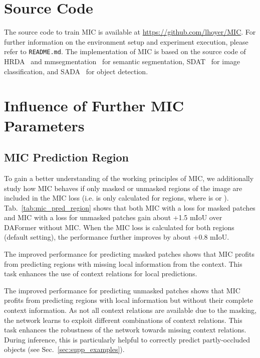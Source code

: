 \documentclass[10pt,twocolumn,letterpaper]{article}
\begin{document}
\section{Source Code}
\label{sec:supp_further_implementation_details}

The source code to train MIC is available at \url{https://github.com/lhoyer/MIC}. For further information on the environment setup and experiment execution, please refer to \texttt{README.md}.
The implementation of MIC is based on the source code of HRDA~\cite{hoyer2022hrda} and mmsegmentation~\cite{mmseg2020} for semantic segmentation, SDAT~\cite{rangwani2022closer} for image classification, and SADA~\cite{chen2021scale} for object detection.

\section{Influence of Further MIC Parameters}
\label{sec:supp_parameters}

\subsection{MIC Prediction Region}

To gain a better understanding of the working principles of MIC, we additionally study how MIC behaves if only masked or unmasked regions of the image are included in the MIC loss (i.e.  is only calculated for regions, where  is  or ). Tab.~\ref{tab:mic_pred_region} shows that both MIC with a loss for masked patches and MIC with a loss for unmasked patches gain about +1.5 mIoU over DAFormer without MIC. When the MIC loss is calculated for both regions (default setting), the performance further improves by about +0.8 mIoU.

The improved performance for predicting masked patches shows that MIC profits from predicting regions with missing local information from the context. This task enhances the use of context relations for local predictions.

The improved performance for predicting unmasked patches shows that MIC profits from predicting regions with local information but without their complete context information. As not all context relations are available due to the masking, the network learns to exploit different combinations of context relations. This task enhances the robustness of the network towards missing context relations. During inference, this is particularly helpful to correctly predict partly-occluded objects (see Sec.~\ref{sec:supp_examples}).
\end{document}
